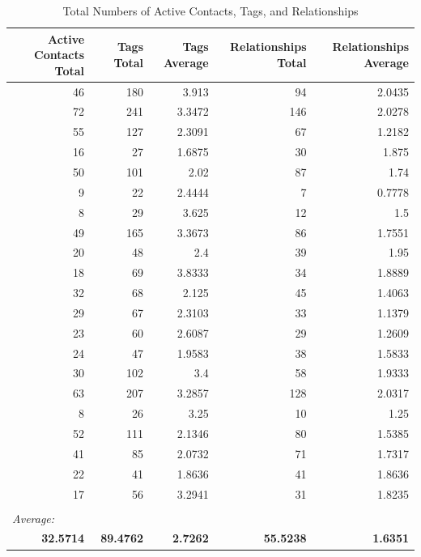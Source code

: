 \begin{table}[htbp]
  \centering
  \caption{Total Numbers of Active Contacts, Tags, and Relationships}\label{table:active_contacts} 
    \begin{tabular}{rrrrr}
    \toprule
    Active Contacts Total & Tags Total & Tags Average & Relationships Total & Relationships Average \\
    \midrule
    46    & 180   & 3.913 & 94    & 2.0435 \\
    72    & 241   & 3.3472 & 146   & 2.0278 \\
    55    & 127   & 2.3091 & 67    & 1.2182 \\
    16    & 27    & 1.6875 & 30    & 1.875 \\
    50    & 101   & 2.02  & 87    & 1.74 \\
    9     & 22    & 2.4444 & 7     & 0.7778 \\
    8     & 29    & 3.625 & 12    & 1.5 \\
    49    & 165   & 3.3673 & 86    & 1.7551 \\
    20    & 48    & 2.4   & 39    & 1.95 \\
    18    & 69    & 3.8333 & 34    & 1.8889 \\
    32    & 68    & 2.125 & 45    & 1.4063 \\
    29    & 67    & 2.3103 & 33    & 1.1379 \\
    23    & 60    & 2.6087 & 29    & 1.2609 \\
    24    & 47    & 1.9583 & 38    & 1.5833 \\
    30    & 102   & 3.4   & 58    & 1.9333 \\
    63    & 207   & 3.2857 & 128   & 2.0317 \\
    8     & 26    & 3.25  & 10    & 1.25 \\
    52    & 111   & 2.1346 & 80    & 1.5385 \\
    41    & 85    & 2.0732 & 71    & 1.7317 \\
    22    & 41    & 1.8636 & 41    & 1.8636 \\
    17    & 56    & 3.2941 & 31    & 1.8235 \\
          &       &       &       &  \\
          \multicolumn{5}{l}{\textit{Average:}} \\ 
    \textbf{32.5714} &  \textbf{89.4762} &  \textbf{2.7262} &  \textbf{55.5238} &  \textbf{1.6351} \\
    \bottomrule
    \end{tabular}%
  \label{tab:addlabel}%
\end{table}%

